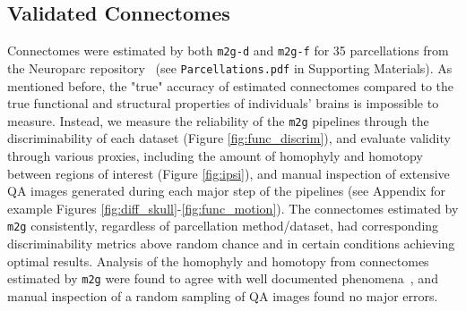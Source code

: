 \subsection{Validated Connectomes}
Connectomes were estimated by both \texttt{m2g-d} and \texttt{m2g-f} for 35 parcellations from the Neuroparc repository~\cite{neuroparc} (see \texttt{Parcellations.pdf} in Supporting Materials). As mentioned before, the "true" accuracy of estimated connectomes compared to the true functional and structural properties of individuals' brains is impossible to measure. Instead, we measure the reliability of the  \texttt{m2g} pipelines through the discriminability of each dataset (Figure \ref{fig:func_discrim}),  and evaluate validity through various proxies, including the amount of homophyly and homotopy between regions of interest (Figure \ref{fig:ipsi}), and manual inspection of extensive QA images generated during each major step of the pipelines (see Appendix for example Figures \ref{fig:diff_skull}-\ref{fig:func_motion}). The connectomes estimated by \texttt{m2g} consistently, regardless of parcellation method/dataset, had corresponding discriminability metrics above random chance and in certain conditions achieving optimal results. Analysis of the homophyly and homotopy from connectomes estimated by \texttt{m2g} were found to agree with well documented phenomena~\cite{ipsi-struct,Stark-ipsi,Biswal-ipsi,Zuo-ipsi}, and manual inspection of a random sampling of QA images found no major errors.

